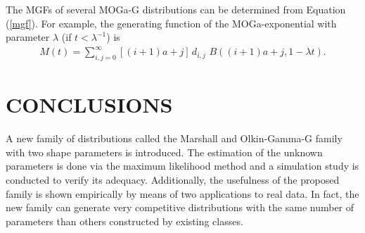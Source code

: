 \documentclass[twoside,leqno,11pt]{article}
\begin{document}
The MGFs of several MOGa-G distributions can be determined from Equation (\ref{mgf}). For example, the generating function of the MOGa-exponential with parameter $\lambda$
(if $t<\lambda^{-1}$) is
\begin{eqnarray*}
\displaystyle
M(t)=\sum_{i,j=0}^{\infty} [(i+1)a+j]\,d_{i,j}\,\,B((i+1)a+j,1-\lambda t).
\end{eqnarray*}


\section{CONCLUSIONS}\label{conclusions}

A new family of distributions called the Marshall and Olkin-Gamma-G family with two shape parameters is introduced. The estimation of the unknown parameters is done via the maximum likelihood method and a simulation study is conducted to verify its adequacy. Additionally, the usefulness of the proposed family is shown empirically by means of two applications to real data. In fact, the new family can generate very competitive distributions with the same number of parameters than others constructed by existing classes.
\end{document}
